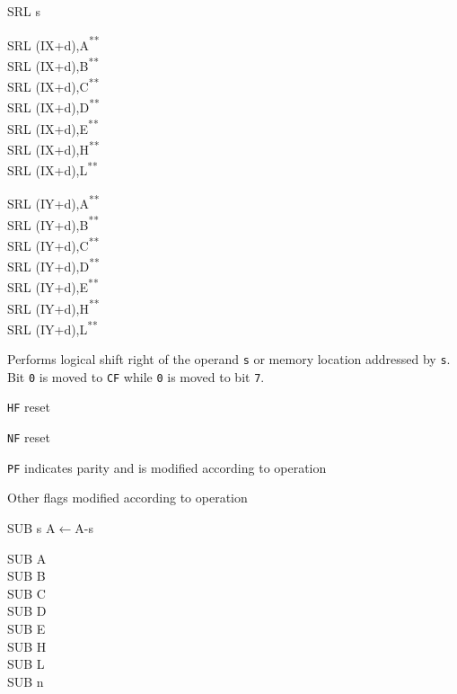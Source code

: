 \documentclass[twoside,openright,a4paper]{book}
\newcommand{\UNDOC}{\textnormal{\textsuperscript{**}}}
\begin{document}
\begin{basedescript}{
	\desclabelstyle{\multilinelabel}
	\desclabelwidth{3cm}}
\begin{detailitem}{SRL s}
\begin{DetailVariants}
			\columnbreak
			SRL (IX+d),A\UNDOC\\
			SRL (IX+d),B\UNDOC\\
			SRL (IX+d),C\UNDOC\\
			SRL (IX+d),D\UNDOC\\
			SRL (IX+d),E\UNDOC\\
			SRL (IX+d),H\UNDOC\\
			SRL (IX+d),L\UNDOC

			\columnbreak
			SRL (IY+d),A\UNDOC\\
			SRL (IY+d),B\UNDOC\\
			SRL (IY+d),C\UNDOC\\
			SRL (IY+d),D\UNDOC\\
			SRL (IY+d),E\UNDOC\\
			SRL (IY+d),H\UNDOC\\
			SRL (IY+d),L\UNDOC
		\end{DetailVariants}

		Performs logical shift right of the operand {\tt s} or memory location addressed by {\tt s}. Bit {\tt 0} is moved to {\tt CF} while {\tt 0} is moved to bit {\tt 7}.

		\begin{DetailEffects}
			\item {\tt HF} reset
			\item {\tt NF} reset
			\item {\tt PF} indicates parity and is modified according to operation
			\item Other flags modified according to operation
		\end{DetailEffects}
						
		\begin{DetailTiming}
		\end{DetailTiming}

	\end{detailitem}

	\begin{detailitem}{SUB s}
		{A$\leftarrow$A-s}

		\begin{DetailVariants}
			SUB A\\
			SUB B\\
			SUB C\\
			SUB D\\
			SUB E\\
			SUB H\\
			SUB L\\
			SUB n


\end{DetailVariants}
\end{detailitem}
\end{basedescript}
\end{document}
